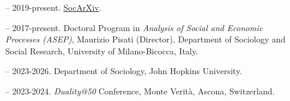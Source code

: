 \begin{itemize}[itemsep=-0.5ex]
    \item[--] 2019-present. \href{https://socopen.org/}{SocArXiv}.
\end{itemize}

\begin{itemize}[itemsep=-0.5ex]
    \item[--] 2017-present. Doctoral Program in {\em Analysis of Social and Economic Processes (ASEP)}, Maurizio Pisati (Director), Department of Sociology and Social Research, University of Milano-Bicocca, Italy. 
\end{itemize}

\begin{itemize}[itemsep=-0.5ex]
    \item[--] 2023-2026. Department of Sociology, John Hopkins University.
    \item[--] 2023-2024. \textit{Duality@50} Conference, Monte Verit\`{a}, Ascona, Switzerland.
\end{itemize}

